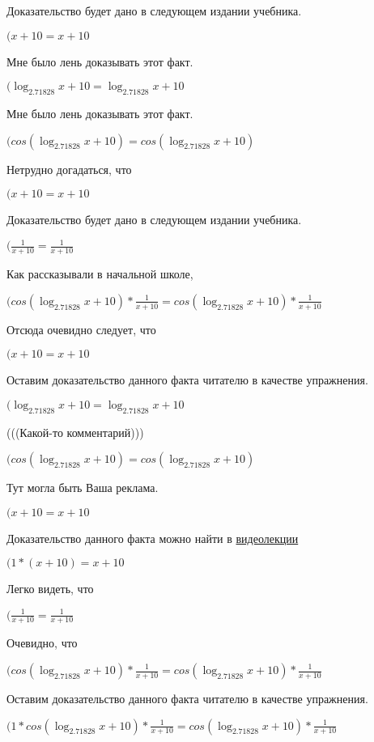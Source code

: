 \documentclass[12pt,a4paper,fleqn]{article}
\theoremstyle{definition}
\begin{document}
Доказательство будет дано в следующем издании учебника.

$( x  +  10  =  x  +  10 $

Мне было лень доказывать этот факт.

$(\log_{ 2.71828 }{ x  +  10 } = \log_{ 2.71828 }{ x  +  10 }$

Мне было лень доказывать этот факт.

$(cos(\log_{ 2.71828 }{ x  +  10 }) = cos(\log_{ 2.71828 }{ x  +  10 })$

Нетрудно догадаться, что

$( x  +  10  =  x  +  10 $

Доказательство будет дано в следующем издании учебника.

$(\frac{ 1 }{ x  +  10 }
 = \frac{ 1 }{ x  +  10 }
$

Как рассказывали в начальной школе,

$(cos(\log_{ 2.71828 }{ x  +  10 }) * \frac{ 1 }{ x  +  10 }
 = cos(\log_{ 2.71828 }{ x  +  10 }) * \frac{ 1 }{ x  +  10 }
$

Отсюда очевидно следует, что

$( x  +  10  =  x  +  10 $

Оставим доказательство данного факта читателю в качестве упражнения.

$(\log_{ 2.71828 }{ x  +  10 } = \log_{ 2.71828 }{ x  +  10 }$

(((Какой-то комментарий)))

$(cos(\log_{ 2.71828 }{ x  +  10 }) = cos(\log_{ 2.71828 }{ x  +  10 })$

Тут могла быть Ваша реклама.

$( x  +  10  =  x  +  10 $

Доказательство данного факта можно найти в \href{https://www.youtube.com/watch?v=dQw4w9WgXcQ}{видеолекции}

$( 1  * ( x  +  10 ) =  x  +  10 $

Легко видеть, что

$(\frac{ 1 }{ x  +  10 }
 = \frac{ 1 }{ x  +  10 }
$

Очевидно, что

$(cos(\log_{ 2.71828 }{ x  +  10 }) * \frac{ 1 }{ x  +  10 }
 = cos(\log_{ 2.71828 }{ x  +  10 }) * \frac{ 1 }{ x  +  10 }
$

Оставим доказательство данного факта читателю в качестве упражнения.

$( 1  * cos(\log_{ 2.71828 }{ x  +  10 }) * \frac{ 1 }{ x  +  10 }
 = cos(\log_{ 2.71828 }{ x  +  10 }) * \frac{ 1 }{ x  +  10 }
$
\end{document}
